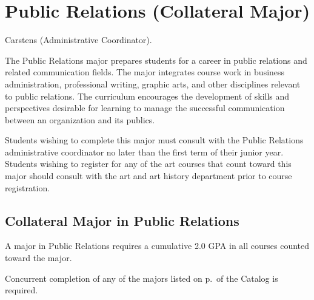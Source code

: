 \documentclass[
  letterpaper,
]{scrbook}
\begin{document}
\hypertarget{public-relations-collateral-major}{%
\section{Public Relations (Collateral
Major)}\label{public-relations-collateral-major}}

Carstens (Administrative Coordinator).

The Public Relations major prepares students for a career in public
relations and related communication fields. The major integrates course
work in business administration, professional writing, graphic arts, and
other disciplines relevant to public relations. The curriculum
encourages the development of skills and perspectives desirable for
learning to manage the successful communication between an organization
and its publics.

Students wishing to complete this major must consult with the Public
Relations administrative coordinator no later than the first term of
their junior year. Students wishing to register for any of the art
courses that count toward this major should consult with the art and art
history department prior to course registration.

\hypertarget{collateral-major-in-public-relations}{%
\subsection{Collateral Major in Public
Relations}\label{collateral-major-in-public-relations}}

A major in Public Relations requires a cumulative 2.0 GPA in all courses
counted toward the major.

Concurrent completion of any of the majors listed on p.~of the Catalog
is required.
\end{document}

